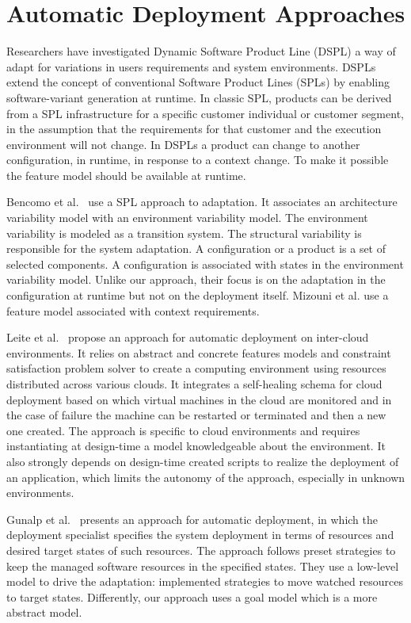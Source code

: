 \section{Automatic Deployment Approaches}
Researchers have investigated Dynamic Software Product Line (DSPL) a way of adapt for variations in users requirements and system environments.
 DSPLs extend the concept of conventional Software Product Lines (SPLs) by enabling software-variant generation at runtime. In classic SPL, products can be derived from a SPL infrastructure for a specific customer individual or customer segment, in the assumption that the requirements for that customer and the execution environment will not change. In DSPLs a product can change to another configuration, in runtime, in response to a context change. To make it possible the feature model should be available at runtime.\cite{bencomo_view_2012}

Bencomo et al.~\cite{bencomo_dynamically_2008} use a SPL approach to adaptation. It  associates an architecture variability model with an environment variability model. The environment variability is modeled as a transition system. The structural variability is responsible for the system adaptation. A configuration or a product is a set of selected components. A configuration is associated with states in the environment variability model. Unlike our approach, their focus is on the adaptation in the configuration at runtime but not on the deployment itself. Mizouni et al. \citep{mizouni_framework_2014} use a feature model associated with context requirements.

Leite et al.~\cite{ferreira_leite_user_2014} propose an approach for automatic deployment on inter-cloud environments. It relies on abstract and concrete features models and constraint satisfaction problem solver to create a computing environment using resources distributed across various clouds.
It integrates a self-healing schema for cloud deployment based on which virtual machines in the cloud are monitored and in the case of failure the machine can be
restarted or terminated and then a new one created.
The approach is specific to cloud environments and requires instantiating at design-time a model knowledgeable about the environment.
It also strongly depends on design-time created scripts to realize the deployment of an application, which limits the autonomy of the approach, especially in unknown environments.

Gunalp et al.~\citep{gunalp_rondo_2015} presents an approach for automatic deployment, in which the deployment specialist specifies the system deployment in terms of resources and desired target states of such resources. The approach follows preset strategies to keep the managed software resources in the specified states. They use a low-level model to drive the adaptation: implemented strategies to move watched resources to target states. Differently, our approach uses a goal model which is a more abstract model. %


